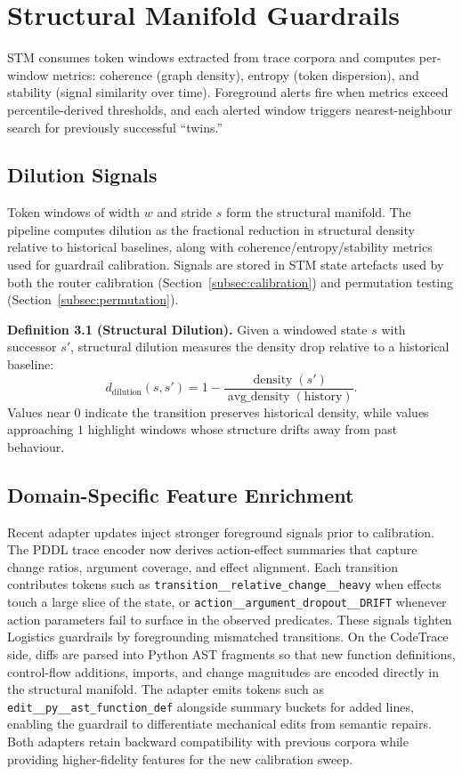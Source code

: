 \documentclass[11pt]{article}
\begin{document}
\section{Structural Manifold Guardrails}
STM consumes token windows extracted from trace corpora and computes per-window
metrics: coherence (graph density), entropy (token dispersion), and stability
(signal similarity over time). Foreground alerts fire when metrics exceed
percentile-derived thresholds, and each alerted window triggers nearest-neighbour
search for previously successful ``twins.''

\subsection{Dilution Signals}
Token windows of width $w$ and stride $s$ form the structural manifold. The
pipeline computes dilution as the fractional reduction in structural density
relative to historical baselines, along with coherence/entropy/stability metrics
used for guardrail calibration. Signals are stored in STM state artefacts used by
both the router calibration (Section~\ref{subsec:calibration}) and permutation
testing (Section~\ref{subsec:permutation}).

\noindent\textbf{Definition 3.1 (Structural Dilution).} Given a windowed state
$s$ with successor $s'$, structural dilution measures the density drop relative to a
historical baseline:
\begin{equation*}
  d_{\text{dilution}}(s,s') = 1 - \frac{\operatorname{density}(s')}{\operatorname{avg\_density}(\text{history})}.
\end{equation*}
Values near $0$ indicate the transition preserves historical density, while
values approaching $1$ highlight windows whose structure drifts away from past
behaviour.

\subsection{Domain-Specific Feature Enrichment}
Recent adapter updates inject stronger foreground signals prior to calibration.
The PDDL trace encoder now derives action-effect summaries that capture change
ratios, argument coverage, and effect alignment. Each transition contributes
tokens such as \texttt{transition\_\_relative\_change\_\_heavy} when effects
touch a large slice of the state, or \texttt{action\_\_argument\_dropout\_\_DRIFT}
whenever action parameters fail to surface in the observed predicates. These
signals tighten Logistics guardrails by foregrounding mismatched transitions.
On the CodeTrace side, diffs are parsed into Python AST fragments so that new
function definitions, control-flow additions, imports, and change magnitudes are
encoded directly in the structural manifold. The adapter emits tokens such as
\texttt{edit\_\_py\_\_ast\_function\_def} alongside summary buckets for added
lines, enabling the guardrail to differentiate mechanical edits from semantic
repairs. Both adapters retain backward compatibility with previous corpora
while providing higher-fidelity features for the new calibration sweep.
\end{document}
